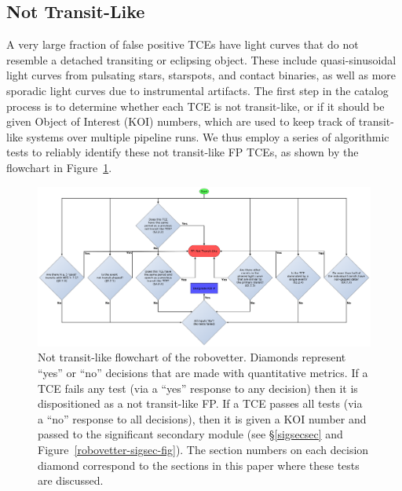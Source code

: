 \subsection{Not Transit-Like}
\label{nottransitlikesec}

A very large fraction of false positive TCEs have light curves that do not resemble a detached transiting or eclipsing object. These include quasi-sinusoidal light curves from pulsating stars, starspots, and contact binaries, as well as more sporadic light curves due to instrumental artifacts. The first step in the catalog process is to determine whether each TCE is not transit-like, or if it should be given \kepler{} Object of Interest (KOI) numbers, which are used to keep track of transit-like systems over multiple \kepler{} pipeline runs. We thus employ a series of algorithmic tests to reliably identify these not transit-like FP TCEs, as shown by the flowchart in Figure~\ref{robovetter-transitlike-fig}.


\begin{figure}[ht]
\centering
\includegraphics[width=\linewidth]{RoboVetter-Diagram-V4-TransitLike.pdf}
\caption{Not transit-like flowchart of the robovetter. Diamonds represent ``yes'' or ``no'' decisions that are made with quantitative metrics. If a TCE fails any test (via a ``yes'' response to any decision) then it is dispositioned as a not transit-like FP. If a TCE passes all tests (via a ``no'' response to all decisions), then it is given a KOI number and passed to the significant secondary module (see \S\ref{sigsecsec} and Figure~\ref{robovetter-sigsec-fig}). The section numbers on each decision diamond correspond to the sections in this paper where these tests are discussed.}
\label{robovetter-transitlike-fig}
\end{figure}



